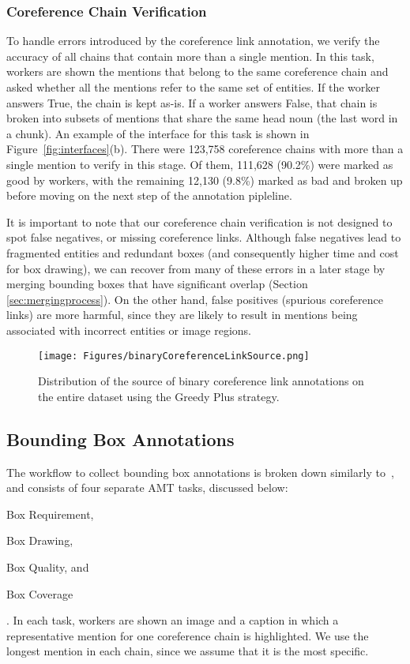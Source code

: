 \documentclass[twocolumn]{svjour3}
\begin{document}
\subsubsection{Coreference Chain Verification}
To handle errors introduced by the coreference link annotation, we verify the accuracy of all chains that contain more than a single mention. In this task, workers are shown the mentions that belong to the same coreference chain and asked whether all the mentions refer to the same set of entities. If the worker answers True, the chain is kept as-is. If a worker answers False, that chain is broken into subsets of mentions that share the same head noun (the last word in a chunk). An example of the interface for this task is shown in Figure~\ref{fig:interfaces}(b). There were 123,758 coreference chains with more than a single mention to verify in this stage.  Of them, 111,628 (90.2\%) were marked as good by workers, with the remaining 12,130 (9.8\%) marked as bad and broken up before moving on the next step of the annotation pipleline.

It is important to note that our coreference chain verification is not designed to spot false negatives, or missing coreference links. Although false negatives lead to fragmented entities and redundant boxes (and consequently higher time and cost for box drawing), we can recover from many of these errors in a later stage by merging bounding boxes that have significant overlap (Section \ref{sec:mergingprocess}). On the other hand, false positives (spurious coreference links) are more harmful, since they are likely to result in mentions being associated with incorrect entities or image regions. 



\begin{figure}
\centering
\texttt{[image: Figures/binaryCoreferenceLinkSource.png]}
\caption{Distribution of the source of binary coreference link annotations on the entire dataset using the Greedy Plus strategy.}
\label{fig:binaryLinkSource}
\end{figure}

\subsection{Bounding Box Annotations} 
\label{sec:box}

The workflow to collect bounding box annotations is broken down similarly to~\citet{HJL_AAAI12}, and consists of four separate AMT tasks, discussed below: \begin{inparaenum}[(1)] \item Box Requirement, \item Box Drawing, \item Box Quality, and \item Box Coverage\end{inparaenum}. In each task, workers are shown an image and a caption in which a representative mention for one coreference chain is highlighted. We use the longest mention in each chain, since we assume that it is the most specific.
\end{document}
